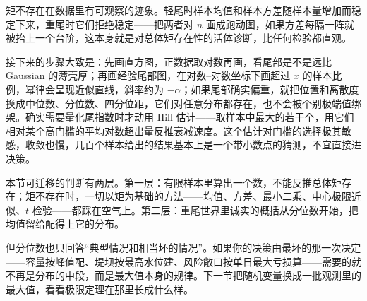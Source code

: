 矩不存在在数据里有可观察的迹象。轻尾时样本均值和样本方差随样本量增加而稳定下来，重尾时它们拒绝稳定——把两者对 \(n\) 画成跑动图，如果方差每隔一阵就被抬上一个台阶，这本身就是对总体矩存在性的活体诊断，比任何检验都直观。

接下来的步骤大致是：先画直方图，正数据取对数再画，看尾部是不是远比 Gaussian 的薄壳厚；再画经验尾部图，在对数--对数坐标下画超过 \(x\) 的样本比例，幂律会呈现近似直线，斜率约为 \(-\alpha\)；如果尾部确实偏重，就把位置和离散度换成中位数、分位数、四分位距，它们对任意分布都存在，也不会被个别极端值绑架。确实需要量化尾指数时才动用 Hill 估计——取样本中最大的若干个，用它们相对某个高门槛的平均对数超出量反推衰减速度。这个估计对门槛的选择极其敏感，收敛也慢，几百个样本给出的结果基本上是一个带小数点的猜测，不宜直接进决策。

本节可迁移的判断有两层。第一层：有限样本里算出一个数，不能反推总体矩存在；矩不存在时，一切以矩为基础的方法——均值、方差、最小二乘、中心极限近似、\(t\) 检验——都踩在空气上。第二层：重尾世界里诚实的概括从分位数开始，把均值留给配得上它的分布。

但分位数也只回答``典型情况和相当坏的情况''。如果你的决策由最坏的那一次决定——容量按峰值配、堤坝按最高水位建、风险敞口按单日最大亏损算——需要的就不再是分布的中段，而是最大值本身的规律。下一节把随机变量换成一批观测里的最大值，看看极限定理在那里长成什么样。
